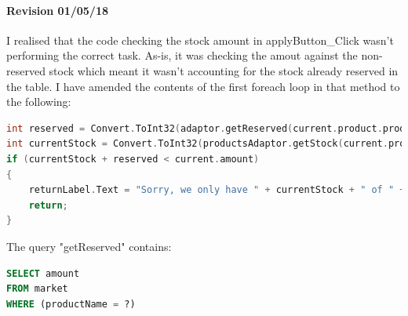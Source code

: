 ﻿\documentclass{article}
\begin{document}
    \paragraph{Revision 01/05/18}
    I realised that the code checking the stock amount in applyButton\_Click wasn't performing the correct task.
    As-is, it was checking the amout against the non-reserved stock which meant it wasn't accounting for the stock already reserved in the table.
    I have amended the contents of the first foreach loop in that method to the following:
    \begin{lstlisting}[language=C]
int reserved = Convert.ToInt32(adaptor.getReserved(current.product.productName));
int currentStock = Convert.ToInt32(productsAdaptor.getStock(current.product.productName));
if (currentStock + reserved < current.amount)
{
    returnLabel.Text = "Sorry, we only have " + currentStock + " of " + current.product.productName;
    return;
}
    \end{lstlisting}
    The query "getReserved" contains:
    \begin{lstlisting}[language=SQL]
SELECT amount
FROM market
WHERE (productName = ?)
    \end{lstlisting}
    \newpage
\end{document}
